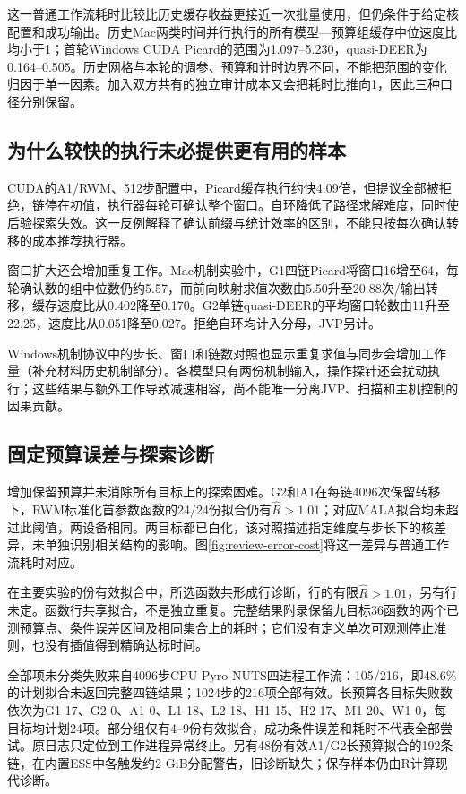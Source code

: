 \documentclass[UTF8,fontset=fandol,zihao=-4]{ctexart}
\begin{document}
这一普通工作流耗时比较比历史缓存收益更接近一次批量使用，但仍条件于给定核配置和成功输出。历史Mac两类时间并行执行的所有模型—预算组缓存中位速度比均小于1；首轮Windows CUDA Picard的范围为1.097--5.230，quasi-DEER为0.164--0.505。历史网格与本轮的调参、预算和计时边界不同，不能把范围的变化归因于单一因素。加入双方共有的独立审计成本又会把耗时比推向1，因此三种口径分别保留。

\subsection{为什么较快的执行未必提供更有用的样本}
CUDA的A1/RWM、512步配置中，Picard缓存执行约快4.09倍，但提议全部被拒绝，链停在初值，执行器每轮可确认整个窗口。自环降低了路径求解难度，同时使后验探索失效。这一反例解释了确认前缀与统计效率的区别，不能只按每次确认转移的成本推荐执行器。

窗口扩大还会增加重复工作。Mac机制实验中，G1四链Picard将窗口16增至64，每轮确认数的组中位数仍约5.57，而前向映射求值次数由5.50升至20.88次/输出转移，缓存速度比从0.402降至0.170。G2单链quasi-DEER的平均窗口轮数由11升至22.25，速度比从0.051降至0.027。拒绝自环均计入分母，JVP另计。

Windows机制协议中的步长、窗口和链数对照也显示重复求值与同步会增加工作量（补充材料历史机制部分）。各模型只有两份机制输入，操作探针还会扰动执行；这些结果与额外工作导致减速相容，尚不能唯一分离JVP、扫描和主机控制的因果贡献。

\subsection{固定预算误差与探索诊断}
增加保留预算并未消除所有目标上的探索困难。G2和A1在每链4096次保留转移下，RWM标准化首参数函数的24/24份拟合仍有$\hat R>1.01$；对应MALA拟合均未超过此阈值，两设备相同。两目标都已白化，该对照描述指定维度与步长下的核差异，未单独识别相关结构的影响。图\ref{fig:review-error-cost}将这一差异与普通工作流耗时对应。

在主要实验的\PBCompactValid{}份有效拟合中，所选函数共形成\PBCompactFunctionRows{}行诊断，\PBCompactHighRhat{}行的有限$\hat R>1.01$，另有\PBCompactUndefinedRhat{}行未定。函数行共享拟合，不是独立重复。完整结果附录保留九目标36函数的两个已测预算点、条件误差区间及相同集合上的耗时；它们没有定义单次可观测停止准则，也没有插值得到精确达标时间。

全部\PBCompactUnclassified{}项未分类失败来自4096步CPU Pyro NUTS四进程工作流：105/216，即48.6\%的计划拟合未返回完整四链结果；1024步的216项全部有效。长预算各目标失败数依次为G1 17、G2 0、A1 0、L1 18、L2 18、H1 15、H2 17、M1 20、W1 0，每目标均计划24项。部分组仅有4--9份有效拟合，成功条件误差和耗时不代表全部尝试。原日志只定位到工作进程异常终止。另有48份有效A1/G2长预算拟合的192条链，在内置ESS中各触发约2 GiB分配警告，旧诊断缺失；保存样本仍由R计算现代诊断。
\end{document}
